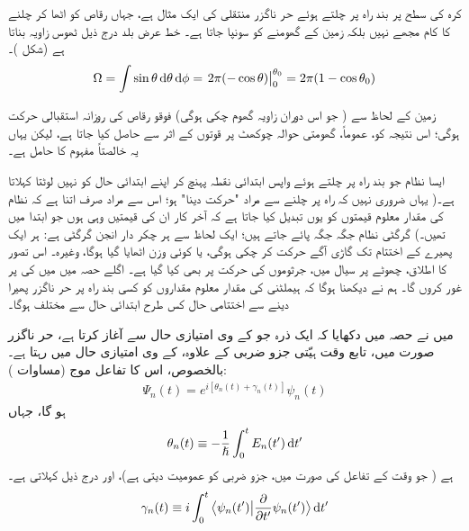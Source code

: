  کرہ کی سطح پر  بند راہ پر چلتے ہوئے حر ناگزر منتقلی کی ایک مثال     ہے،  جہاں  رقاص  کو اٹھا کر چلنے کا کام مجھے نہیں  بلکہ زمین کے گھومنے کو  سونپا جاتا ہے۔  خط عرض بلد  درج ذیل ٹھوس زاویہ بناتا ہے  (شکل   )۔ 
\begin{align}\label{مساوات_حر_ٹھوس_زاویہ}
\Omega = \int \sin \theta \dif \theta \dif \phi =\left.  2\pi (- \cos \theta)\right\vert_0^{\theta_0} = 2 \pi (1 - \cos \theta_0)
\end{align}
%



زمین کے لحاظ سے ( جو اس دوران  زاویہ گھوم چکی  ہوگی)  فوقو    رقاص   کی روزانہ استقبالی حرکت   ہوگی؛ اس نتیجہ کو، عموماً،   گھومتی حوالہ چوکھٹ پر    قوتوں کے اثر  سے حاصل کیا جاتا ہے، لیکن یہاں یہ خالصتاً    مفہوم کا حامل ہے۔ 

 ایسا نظام جو بند راہ پر چلتے ہوئے   واپس ابتدائی  نقطہ  پہنچ کر اپنے  ابتدائی حال کو  نہیں لوٹتا    کہلاتا ہے۔(  یہاں ضروری نہیں کہ  راہ پر چلنے سے مراد "حرکت دینا"  ہو؛  اس سے مراد صرف اتنا ہے کہ نظام کی مقدار معلوم قیمتوں کو یوں تبدیل کیا جاتا ہے کہ آخر کار ان کی قیمتیں وہی ہوں جو ابتدا میں تھیں۔)   گرگٹی  نظام  جگہ جگہ پائے جاتے ہیں؛  ایک لحاظ سے ہر چکر دار انجن  گرگٹی  ہے:  ہر ایک پھیرے  کے اختتام تک گاڑی آگے حرکت کر چکی ہوگی،  یا کوئی وزن اٹھایا گیا ہوگا،  وغیرہ۔ اس تصور کا اطلاق،    چھوٹے    پر  سیال میں،  جرثوموں کی حرکت پر بھی کیا گیا ہے۔     اگلے حصہ میں میں     کی   پر غور کروں گا۔ ہم نے دیکھنا ہوگا کہ ہیملٹنی کی  مقدار معلوم مقداروں کو کسی بند راہ پر حر ناگزر پھیرا دینے سے اختتامی حال کس طرح ابتدائی حال سے مختلف ہوگا۔ 


میں نے حصہ    میں دکھایا کہ  ایک ذرہ جو  کے  وی امتیازی حال سے آغاز کرتا ہے،  حر ناگزر صورت  میں، تابع وقت ہیّتی جزو ضربی کے علاوہ،   کے   وی امتیازی حال میں  رہتا ہے۔ بالخصوص،  اس کا تفاعل موج (مساوات  ):
\begin{align}
\Psi_n (t) = e^{i[\theta_n (t) + \gamma_n (t)]} \psi_n (t)
\end{align} 
ہو گا، جہاں 
\begin{align}
\theta_n (t) \equiv - \frac{1}{\hslash} \int_0^t E_n (t') \dif t'
\end{align}
  ہے ( جو وقت کے  تفاعل  کی صورت میں،   جزو ضربی  کو عمومیت دیتی ہے)،   اور درج ذیل  کہلاتی ہے۔
\begin{align}
\gamma_n(t)\equiv i\int_0^t \big\langle \psi_n(t')\big|\frac{\partial}{\partial t'}\psi_n(t')\big \rangle \dif t'
\end{align}

